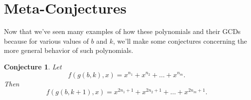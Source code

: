 \documentclass{article}
\newtheorem{conjecture}{Conjecture}
\begin{document}
	\newpage
	\section{Meta-Conjectures}
	Now that we've seen many examples of how these polynomials and their GCDs because for various values of $b$ and $k$, we'll make some conjectures concerning the more general behavior of such polynomials.
	
	\begin{conjecture}
		Let
		\begin{equation*}
			f(g(b,k),x) = x^{n_1} + x^{n_2} + \dots + x^{n_m}.
		\end{equation*}
		Then
		\begin{equation*}
			f(g(b,k+1),x) = x^{2n_1 + 1} + x^{2n_2 + 1} + \dots + x^{2n_m + 1}.
		\end{equation*}
	\end{conjecture}
\end{document}
